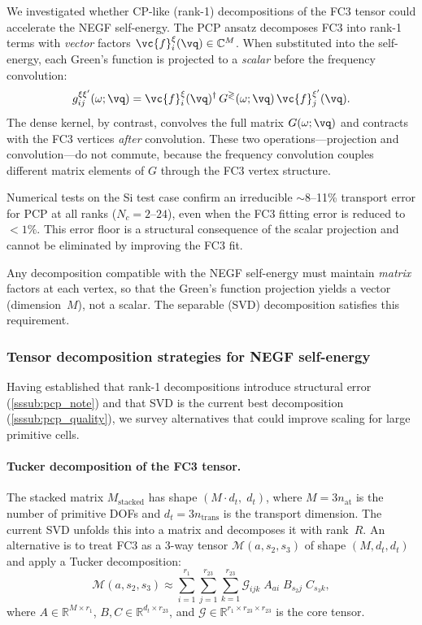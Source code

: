 We investigated whether CP-like (rank-1) decompositions of the FC3
tensor could accelerate the NEGF self-energy.  The PCP ansatz
decomposes FC3 into rank-1 terms with \emph{vector} factors
$\vc{f}_i^\xi(\vq) \in \mathbb{C}^{M}$.  When substituted into the
self-energy, each Green's function is projected to a \emph{scalar}
before the frequency convolution:
\begin{equation}
  g_{ij}^{\xi\xi'}(\omega;\vq)
  = \vc{f}_i^{\xi}(\vq)^\dagger\,G^{\gtrless}(\omega;\vq)\,
    \vc{f}_j^{\xi'}(\vq).
\end{equation}
The dense kernel, by contrast, convolves the full matrix
$G(\omega;\vq)$ and contracts with the FC3 vertices \emph{after}
convolution.  These two operations---projection and
convolution---do not commute, because the frequency convolution
couples different matrix elements of $G$ through the FC3 vertex
structure.

Numerical tests on the Si test case confirm an irreducible
$\sim$8--11\% transport error for PCP at all ranks ($N_c = 2$--$24$),
even when the FC3 fitting error is reduced to $< 1\%$.  This error
floor is a structural consequence of the scalar projection and cannot
be eliminated by improving the FC3 fit.

Any decomposition compatible with the NEGF self-energy must maintain
\emph{matrix} factors at each vertex, so that the Green's function
projection yields a vector (dimension~$M$), not a scalar.  The
separable (SVD) decomposition satisfies this requirement.


\subsubsection{Tensor decomposition strategies for NEGF self-energy}
\label{sssub:tensor_decomp}

Having established that rank-1 decompositions introduce structural
error (\cref{sssub:pcp_note}) and that SVD is the current best
decomposition (\cref{sssub:pcp_quality}), we survey alternatives
that could improve scaling for large primitive cells.

\paragraph{Tucker decomposition of the FC3 tensor.}
The stacked matrix $M_\mathrm{stacked}$ has shape
$(M \cdot d_t,\; d_t)$, where $M = 3 n_\mathrm{at}$ is the number of
primitive DOFs and $d_t = 3 n_\mathrm{trans}$ is the transport
dimension.  The current SVD unfolds this into a matrix and decomposes
it with rank~$R$.  An alternative is to treat FC3 as a 3-way tensor
$\mathcal{M}(a, s_2, s_3)$ of shape $(M, d_t, d_t)$ and apply a
Tucker decomposition:
\begin{equation}\label{eq:tucker}
  \mathcal{M}(a, s_2, s_3)
  \approx \sum_{i=1}^{r_1} \sum_{j=1}^{r_{23}} \sum_{k=1}^{r_{23}}
    \mathcal{G}_{ijk}\;A_{ai}\;B_{s_2 j}\;C_{s_3 k},
\end{equation}
where $A \in \mathbb{R}^{M \times r_1}$,
$B, C \in \mathbb{R}^{d_t \times r_{23}}$, and
$\mathcal{G} \in \mathbb{R}^{r_1 \times r_{23} \times r_{23}}$ is
the core tensor.


